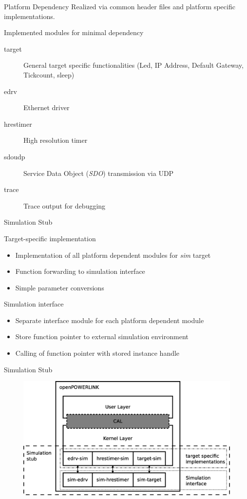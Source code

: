 \begin{frame}{Platform Dependency}
    Realized via common header files and platform specific implementations.
    
    \begin{block}{Implemented modules for minimal dependency}
        \begin{description}
            \item[target] General target specific functionalities (Led, IP Address, Default Gateway, Tickcount, sleep)
            \item[edrv] Ethernet driver
            \item[hrestimer] High resolution timer
            \item[sdoudp] Service Data Object (\emph{SDO}) transmission via UDP
            \item[trace] Trace output for debugging
        \end{description}
    \end{block}
\end{frame}

\begin{frame}{Simulation Stub}
    \begin{block}{Target-specific implementation}
        \begin{itemize}
            \item Implementation of all platform dependent modules for \emph{sim} target
            \item Function forwarding to simulation interface
            \item Simple parameter conversions
        \end{itemize}
    \end{block}
    \begin{block}{Simulation interface}
        \begin{itemize}
            \item Separate interface module for each platform dependent module
            \item Store function pointer to external simulation environment
            \item Calling of function pointer with stored instance handle
        \end{itemize}
    \end{block}    
\end{frame}

\begin{frame}{Simulation Stub}
    \begin{figure}
        \includegraphics[width=\textwidth]{../../thesis/images/simulation_stub.eps}
    \end{figure}
\end{frame}